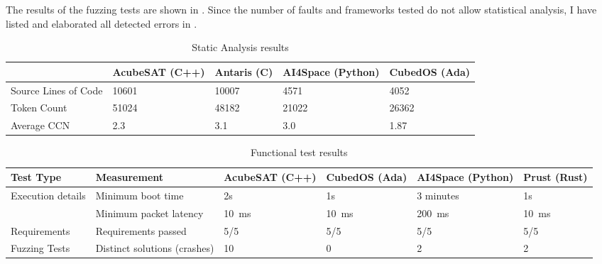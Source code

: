 \documentclass[a4paper,nobib,justified,final]{tufte-book}
\begin{document}
The results of the fuzzing tests are shown in .
Since the number of faults and frameworks tested do not allow statistical analysis, I have listed and elaborated all detected errors in .

\begin{table}[h]
	\begin{tabular}{@{}lllll@{}}
		\toprule
		& AcubeSAT (C++) & Antaris (C) & AI4Space (Python) & CubedOS (Ada) \\ \midrule
		Source Lines of Code & \num{10601} & \num{10007} &  \num{4571} & \num{4052}  \\
		Token Count & \num{51024} & \num{48182} & \num{21022} & \num{26362}     \\
		Average \acs{CCN} & \num{2.3} & \num{3.1} & \num{3.0} & \num{1.87} \\ \bottomrule
	\end{tabular}\vspace{4ex}%
	\caption{Static Analysis results}
	\label{tab:m_software_fuzz_static}
\end{table}

\begin{table}[h]
	\begin{adjustbox}{max width=\textwidth,center}
	\begin{tabular}{@{}llllll@{}}
	\toprule
	Test Type & Measurement & AcubeSAT (C++) & CubedOS (Ada) & AI4Space (Python) & Prust (Rust) \\ \midrule
	Execution details & Minimum boot time &  2s & 1s & 3 minutes & 1s \\
	& Minimum packet latency & \qty{10}{\milli\second} & \qty{10}{\milli\second} & \qty{200}{\milli\second}  & \qty{10}{\milli\second}  \\ 
	\midrule
	Requirements & Requirements passed & 5/5 & 5/5  & 5/5  & 5/5 \\
	\midrule
	Fuzzing Tests & Distinct solutions (crashes) & 10 & 0  & 2  & 2 \\
	\bottomrule
	\end{tabular}
	\vspace{0.5cm}
\end{adjustbox}
	\caption{Functional test results}
	\label{tab:m_software_fuzz_functional}
\end{table}
\end{document}
